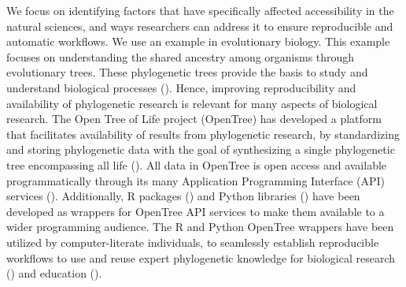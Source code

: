\documentclass[12pt]{article}
\begin{document}
\bigskip
\bigskip

\noindent{}
\bigskip

We focus on identifying factors that have specifically affected accessibility in the natural sciences, and ways researchers can address it to ensure reproducible and automatic workflows.
We use an example in evolutionary biology. This example focuses on understanding the shared ancestry among organisms through evolutionary trees. These phylogenetic trees provide the basis to study and understand biological processes (\cite{dobzhansky1973nothing}). Hence, improving reproducibility and availability of phylogenetic research is relevant for many aspects of biological research.
The Open Tree of Life project (OpenTree) has developed a platform that facilitates availability of results from phylogenetic research, by standardizing and storing phylogenetic data with the goal of synthesizing a single phylogenetic tree encompassing all life (\cite{opentreeoflife2019synth}).
All data in OpenTree is open access and available programmatically through its many Application Programming Interface (API) services (\cite{opentreeAPIs}).
Additionally, R packages (\cite{michonneau2016rotl}) and Python libraries (\cite{mctavish2021opentree}) have been developed as wrappers for OpenTree API services to make them available to a wider programming audience.
The R and Python OpenTree wrappers have been utilized by computer-literate individuals, to seamlessly establish reproducible workflows to use and reuse expert phylogenetic knowledge for biological research (\cite{sanchez2019datelife}) and education (\cite{nguyen2020phylotastic, phylotasticedtools, galacticedtools}).
\end{document}
